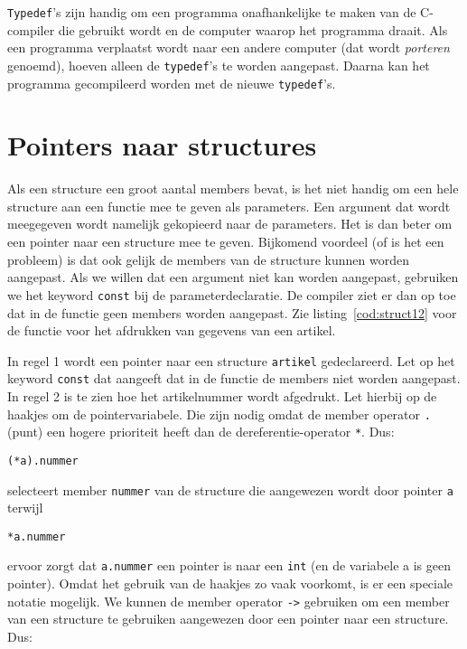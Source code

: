 \texttt{Typedef}'s zijn handig om een programma onafhankelijke te maken van de C-compiler die gebruikt wordt en de computer waarop het programma draait. Als een programma verplaatst wordt naar een andere computer (dat wordt \textsl{porteren} genoemd), hoeven alleen de \texttt{typedef}'s te worden aangepast. Daarna kan het programma gecompileerd worden met de nieuwe \texttt{typedef}'s.

\section{Pointers naar structures}
Als een structure een groot aantal members bevat, is het niet handig om een hele structure aan een functie mee te geven als parameters. Een argument dat wordt meegegeven wordt namelijk gekopieerd naar de parameters. Het is dan beter om een pointer naar een structure mee te geven. Bijkomend voordeel (of is het een probleem) is dat ook gelijk de members van de structure kunnen worden aangepast. Als we willen dat een argument niet kan worden aangepast, gebruiken we het keyword \texttt{const} bij de parameterdeclaratie. De compiler ziet er dan op toe dat in de functie geen members worden aangepast. Zie listing~\ref{cod:struct12} voor de functie voor het afdrukken van gegevens van een artikel.


In regel 1 wordt een pointer naar een structure \texttt{artikel} gedeclareerd. Let op het keyword \texttt{const} dat aangeeft dat in de functie de members niet worden aangepast. In regel 2 is te zien hoe het artikelnummer wordt afgedrukt. Let hierbij op de haakjes om de pointervariabele. Die zijn nodig omdat de member operator \texttt{.} (punt) een hogere prioriteit heeft dan de dereferentie-operator \texttt{*}. Dus:

\hspace*{1em}\texttt{(*a).nummer}

selecteert member \texttt{nummer} van de structure die aangewezen wordt door pointer \texttt{a} terwijl

\hspace*{1em}\texttt{*a.nummer}

ervoor zorgt dat \texttt{a.nummer} een pointer is naar een \texttt{int} (en de variabele a is geen pointer).
Omdat het gebruik van de haakjes zo vaak voorkomt, is er een speciale notatie mogelijk. We kunnen de member operator \texttt{->}\indexop{->} gebruiken om een member van een structure te gebruiken aangewezen door een pointer naar een structure. Dus:

